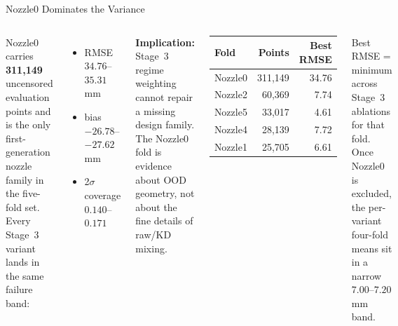 \documentclass[UTF8,aspectratio=169]{ctexbeamer}
\begin{document}
\begin{frame}{Nozzle0 Dominates the Variance}
\small
\begin{columns}[T]
Nozzle0 carries \textbf{311{,}149} uncensored evaluation points and is the only first-generation
nozzle family in the five-fold set. Every Stage~3 variant lands in the same failure band:
\begin{itemize}\setlength\itemsep{3pt}
  \item RMSE \(34.76\)--\(35.31\) mm
  \item bias \(-26.78\)--\(-27.62\) mm
  \item 2\(\sigma\) coverage \(0.140\)--\(0.171\)
\end{itemize}

\vspace{0.4em}
\textbf{Implication:} Stage~3 regime weighting cannot repair a missing design family. The
Nozzle0 fold is evidence about OOD geometry, not about the fine details of raw/KD mixing.

\begin{center}
\renewcommand{\arraystretch}{1.18}
\small
\begin{tabular}{@{}lrr@{}}
\toprule
\textbf{Fold} & \textbf{Points} & \textbf{Best RMSE} \\
\midrule
Nozzle0 & 311{,}149 & 34.76 \\
Nozzle2 & 60{,}369 & 7.74 \\
Nozzle5 & 33{,}017 & 4.61 \\
Nozzle4 & 28{,}139 & 7.72 \\
Nozzle1 & 25{,}705 & 6.61 \\
\bottomrule
\end{tabular}
\end{center}
\vspace{0.5em}
\footnotesize
Best RMSE = minimum across Stage~3 ablations for that fold. Once Nozzle0 is excluded,
the per-variant four-fold means sit in a narrow \(7.00\)--\(7.20\) mm band.
\end{columns}
\end{frame}
\end{document}
